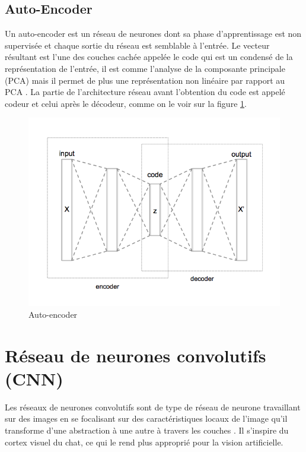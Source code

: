 \subsection{Auto-Encoder}
Un auto-encoder est un réseau de neurones dont sa phase d'apprentissage est non supervisée et chaque sortie du réseau est semblable à l'entrée. Le vecteur résultant est l'une des couches cachée appelée le code qui est un condensé de la représentation de l'entrée, il est comme l'analyse de la composante principale (PCA) mais il permet de plus une représentation non linéaire par rapport au PCA \cite{ann1}. La partie de l'architecture réseau avant l'obtention du code est appelé codeur et celui après le décodeur, comme on le voir sur la figure \ref{autot_encoder}.
\begin{figure}[H]
    \centering
    \includegraphics[scale = 0.4]{images/Autoencoder_structure.png}
    \caption{Auto-encoder}
    \label{autot_encoder}
\end{figure}

\section{Réseau de neurones convolutifs (CNN)}
Les réseaux de neurones convolutifs sont de type de réseau de neurone travaillant sur des images en se focalisant sur des caractéristiques locaux de l'image qu'il transforme d'une abstraction à une autre à travers les couches \cite{adavencedCNN}. Il s'inspire du cortex visuel du chat, ce qui le rend plus approprié pour la vision artificielle.\\

